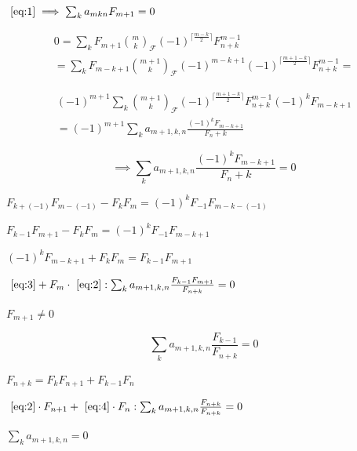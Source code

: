 \documentclass{article}
\begin{document}
\(~\eqref{eq:1} \implies \sum_{k} a_{mkn}F_{m+1} = 0 \)

\begin{multline*}
0 = \sum_{k} F_{m+1}\binom{m}{k}_{\mathcal{F}}{(-1)}^{\lceil\frac{m-k}{2}\rceil}F_{n+k}^{m-1} \\
= \sum_{k} F_{m-k+1}\binom{m+1}{k}_{\mathcal{F}}{(-1)}^{m-k+1} {(-1)}^{\lceil \frac{m + 1 -k}{2}\rceil}F_{n+k}^{m-1} =
\end{multline*}

\begin{multline*}
{(-1)}^{m+1} \sum_{k} \binom{m+1}{k}_{\mathcal{F}} {(-1)}^{\lceil \frac{m + 1 -k}{2}\rceil}F_{n+k}^{m-1}{(-1)}^{k}F_{m-k+1} \\
= {(-1)}^{m+1} \sum_{k} a_{m+1,k,n}\frac{{(-1)}^{k}F_{m-k+1}}{F_{n}+k}
\end{multline*}

\[\implies \sum_{k} a_{m+1,k,n}\frac{{(-1)}^{k}F_{m-k+1}}{F_{n}+k} = 0 \tag{3}\label{eq:3}\]

\( F_{k+(-1)}F_{m-(-1)}-F_{k}F_{m} = {(-1)}^{k}F_{-1}F_{m-k-(-1)} \)

\( F_{k-1}F_{m+1} - F_{k}F_{m} = {(-1)}^{k}F_{-1}F_{m-k+1} \)

\( {(-1)}^{k}F_{m-k+1} + F_{k} F_{m} = F_{k-1}F_{m+1} \)

\(~\eqref{eq:3} + F_{m} \cdot~\eqref{eq:2}: \sum_{k} a_{m+1,k,n}\frac{F_{k-1}F_{m+1}}{F_{n+k}} = 0 \)

\( F_{m+1} \neq 0 \)

\[\sum_{k} a_{m+1,k,n}\frac{F_{k-1}}{F_{n+k}} = 0 \tag{4}\label{eq:4}\]

\( F_{n+k} = F_{k}F_{n+1} + F_{k-1}F_{n} \)

\(~\eqref{eq:2}\cdot F_{n+1} +~\eqref{eq:4} \cdot F_{n}: \sum_{k} a_{m+1,k,n}\frac{F_{n+k}}{F_{n+k}} = 0 \)

\( \sum_{k} a_{m+1,k,n} = 0 \)
\end{document}
